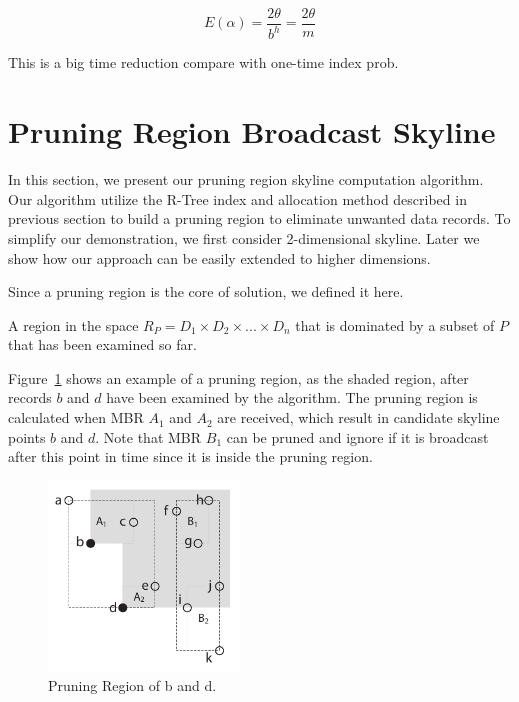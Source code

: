 \documentclass{sig-alternate}
\newenvironment{definition}[1][Definition]{\begin{trivlist}
\item[\hskip \labelsep {\bfseries #1}]}{\end{trivlist}}
\begin{document}
\begin{equation}
E(\alpha) = \frac{2\theta}{b^h} = \frac{2\theta}{m}
\end{equation}

This is a big time reduction compare with one-time index prob.


\section{Pruning Region Broadcast Skyline}
In this section, we present our pruning region skyline computation algorithm.
Our algorithm utilize the R-Tree index and allocation method described in
previous section to build a pruning region to eliminate unwanted data records.
To simplify our demonstration, we first consider 2-dimensional skyline. Later
we show how our approach can be easily extended to higher dimensions.

Since a pruning region is the core of solution, we defined it here.

\begin{definition}[Pruning Region] A region in the space
$R_P = D_1 \times D_2 \times ... \times D_n$
that is dominated by a subset of $P$ that has been
examined so far.
\end{definition}

Figure~\ref{fig:rtree_pr} shows an example of a pruning region, as
the shaded region, after records $b$ and $d$ have been examined by the
algorithm. The pruning region is calculated when MBR $A_1$ and $A_2$
are received, which result in candidate skyline points $b$ and $d$.
Note that MBR $B_1$ can be pruned and ignore if it is broadcast
after this point in time since it is inside the pruning region.

\begin{figure}[!h]
\begin{center}
\includegraphics[width=2in]{Figures/rtree_pr2.pdf}
\caption{\small Pruning Region of b and d.\label{fig:rtree_pr}}
\end{center}
\end{figure}
\end{document}
